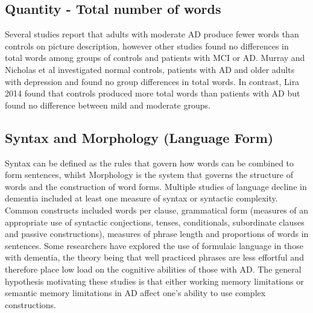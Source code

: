 \documentclass[12pt]{article}
\begin{document}
\subsection{Quantity - Total number of words}
Several studies report that adults with moderate AD produce fewer words than controls on picture description, however other studies found no differences in total words among groups of controls and patients with MCI or AD. Murray and Nicholas et al investigated normal controls, patients with AD and older adults with depression and found no group differences in total words. In contrast, Lira 2014 found that controls produced more total words than patients with AD but found no difference between mild and moderate groups. \newline
\par
\subsection{Syntax and Morphology (Language Form)}
Syntax can be defined as the rules that govern how words can be combined to form sentences, whilst Morphology is the system that governs the structure of words and the construction of word forms. Multiple studies of language decline in dementia included at least one measure of syntax or syntactic complexity. Common constructs included words per clause, grammatical form (measures of an appropriate use of syntactic conjections, tenses, conditionals, subordinate clauses and passive constructions), measures of phrase length and proportions of words in sentences. Some researchers have explored the use of formulaic language in those with dementia, the theory being that well practiced phrases are less effortful and therefore place low load on the cognitive abilities of those with AD. The general hypothesis motivating these studies is that either working memory limitations or semantic memory limitations in AD affect one's ability to use complex constructions.
\par
\end{document}

